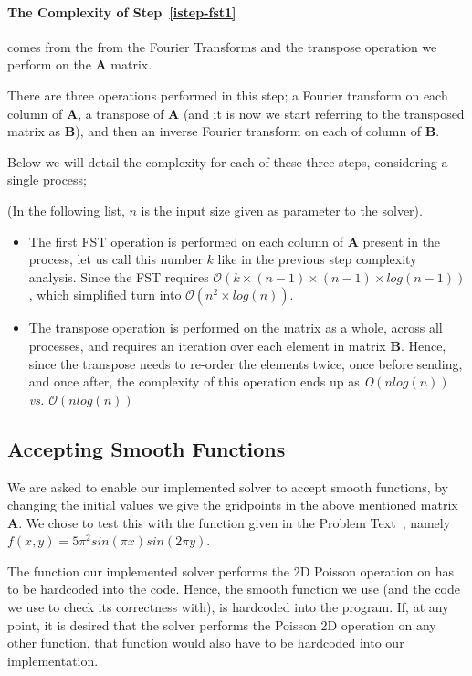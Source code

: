 \documentclass[fontsize=11pt,paper=a4,titlepage]{article}
\begin{document}
\paragraph{The Complexity of Step~\ref{istep-fst1}} comes from the from the
Fourier Transforms and the transpose operation we perform on the $\mathbf{A}$
matrix.

There are three operations performed in this step; a Fourier transform on each
column of $\mathbf{A}$, a transpose of $\mathbf{A}$ (and it is now we start
referring to the transposed matrix as $\mathbf{B}$), and then an inverse Fourier
transform on each of column of $\mathbf{B}$.

Below we will detail the complexity for each of these three steps, considering a
single process;

(In the following list, $n$ is the input size given as parameter to the solver).
\begin{itemize}
	\item The first FST operation is performed on each column of $\mathbf{A}$
	present in the process, let us call this number $k$ like in the previous
	step complexity analysis. Since the FST requires $\mathcal{O}(k\times (n-1)
	\times (n-1)\times log(n-1))$, which simplified turn into $\mathcal{O}(n^2
	\times log(n))$.

	\item The transpose operation is performed on the matrix as a whole, across
	all processes, and requires an iteration over each element in matrix $
	\mathbf{B}$. Hence, since the transpose needs to re-order the elements
	twice, once before sending, and once after, the complexity of this operation
	ends up as \it{O}$(nlog(n))$ vs. $\mathcal{O}(nlog(n))$
\end{itemize}

\subsection{Accepting Smooth Functions}

We are asked to enable our implemented solver to accept smooth functions, by
changing the initial values we give the gridpoints in the above mentioned matrix
$\mathbf{A}$. We chose to test this with the function given in the Problem
Text~\cite{InsertReferenceHere}, namely $f(x,y) = 5\pi^2 sin(\pi x) sin(2\pi
y)$.

The function our implemented solver performs the 2D Poisson operation on has to
be hardcoded into the code. Hence, the smooth function we use (and the code we
use to check its correctness with), is hardcoded into the program. If, at any
point, it is desired that the solver performs the Poisson 2D operation on any
other function, that function would also have to be hardcoded into our
implementation.
\end{document}
